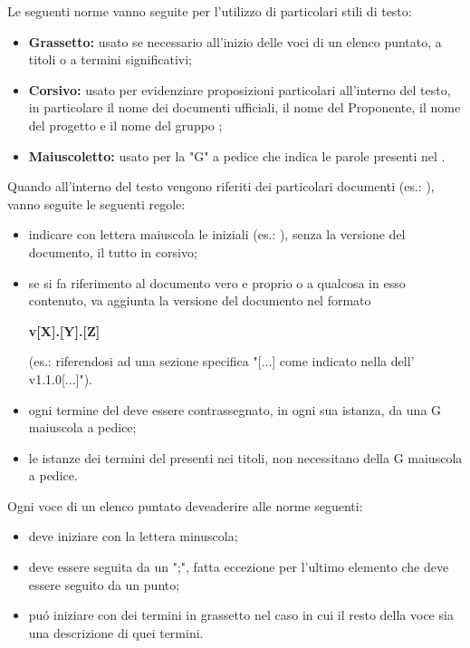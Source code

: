         Le seguenti norme vanno seguite per l'utilizzo di particolari stili di testo:
        \begin{itemize}
          \item \textbf{Grassetto:} usato se necessario all'inizio delle voci di un elenco puntato, a titoli o a termini significativi;
          \item \textbf{Corsivo:} usato per evidenziare proposizioni particolari all'interno del testo, in particolare il nome dei documenti ufficiali, il nome del Proponente, il nome del progetto \textit{\NomeProgetto} e il nome del gruppo \textit{\Gruppo{}};
          \item \textbf{Maiuscoletto:} usato per la "G" a pedice che indica le parole presenti nel \Glossario{}.
        \end{itemize}
        Quando all'interno del testo vengono riferiti dei particolari documenti (es.: \AdR), vanno seguite le seguenti regole:
        \begin{itemize}
          \item indicare con lettera maiuscola le iniziali (es.: \AdR), senza la versione del documento, il tutto in corsivo;
          \item se si fa riferimento al documento vero e proprio o a qualcosa in esso contenuto, va aggiunta la versione del documento nel formato
          \begin{center}
              \textbf{v[X].[Y].[Z]}
          \end{center}
          (es.: riferendosi ad una sezione specifica "[...] come indicato nella  dell' \AdR v1.1.0[...]").
        \end{itemize}
        \begin{itemize}
          \item ogni termine del \Glossario{} deve essere contrassegnato, in ogni sua istanza, da una G maiuscola a pedice;
          \item le istanze dei termini del \Glossario{} presenti nei titoli, non necessitano della G maiuscola a pedice.
        \end{itemize}

          Ogni voce di un elenco puntato deveaderire alle norme seguenti:
          \begin{itemize}
            \item deve iniziare con la lettera minuscola;
            \item deve essere seguita da un ";", fatta eccezione per l'ultimo elemento che deve essere seguito da un punto;
            \item puó iniziare con dei termini in grassetto nel caso in cui il resto della voce sia una descrizione di quei termini.
          \end{itemize}

